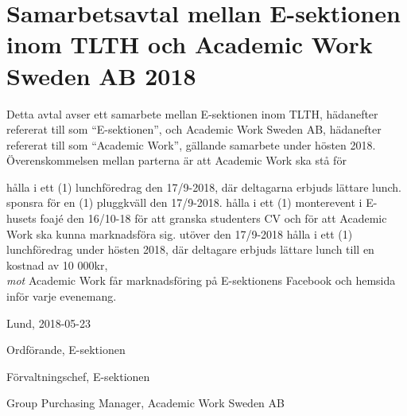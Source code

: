 \documentclass[10pt]{article}
\def\year{2018}
\def\doctitle{Samarbetsavtal mellan E-sektionen inom TLTH och Academic Work Sweden AB {\year}}
\def\date{2018-05-23} %
\begin{document}
        \section*{\doctitle}
        Detta avtal avser ett samarbete mellan E-sektionen inom TLTH, hädanefter refererat till som “E-sektionen”, och Academic Work Sweden AB, hädanefter refererat till som “Academic Work”, gällande samarbete under hösten 2018.\\
        Överenskommelsen mellan parterna är att Academic Work ska stå för
        \begin{attsatser}
            \att hålla i ett (1) lunchföredrag den 17/9-2018, där deltagarna erbjuds lättare lunch. 
            \att sponsra för en (1) pluggkväll den 17/9-2018.
            \att hålla i ett (1) monterevent i E-husets foajé den 16/10-18 för att granska studenters CV och för att Academic Work ska kunna marknadsföra sig.
            \att utöver den 17/9-2018 hålla i ett (1) lunchföredrag under hösten 2018, där deltagare erbjuds lättare lunch till en kostnad av 10 000kr,\\
            \textit{mot}
            \att Academic Work får marknadsföring på E-sektionens Facebook och hemsida inför varje evenemang.
        \end{attsatser}
        
        \begin{signatures}{3}
            Lund, \date
            \signature{Daniel Bakic}{Ordförande, E-sektionen}
            \signature{Magnus Lundh}{Förvaltningschef, E-sektionen}
            \signature{Niklas Dennerholt}{Group Purchasing Manager, Academic Work Sweden AB}
        \end{signatures}
    
\end{document}
